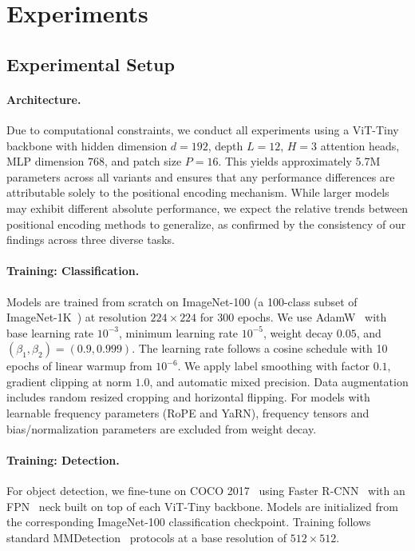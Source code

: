 \section{Experiments}
\label{sec:experiments}

\subsection{Experimental Setup}

\paragraph{Architecture.}
Due to computational constraints, we conduct all experiments using a ViT-Tiny backbone with hidden
dimension $d = 192$, depth $L = 12$, $H = 3$ attention heads, MLP dimension $768$, and patch size
$P = 16$. This yields approximately 5.7M parameters across all variants and ensures that any
performance differences are attributable solely to the positional encoding mechanism. While larger
models may exhibit different absolute performance, we expect the relative trends between positional
encoding methods to generalize, as confirmed by the consistency of our findings across three
diverse tasks.

\paragraph{Training: Classification.}
Models are trained from scratch on ImageNet-100 (a 100-class subset of ImageNet-1K~\cite{deng2009imagenet}) at resolution
$224 \times 224$ for 300 epochs. We use AdamW~\cite{loshchilov2019decoupled} with base learning rate $10^{-3}$, minimum learning
rate $10^{-5}$, weight decay $0.05$, and $(\beta_1, \beta_2) = (0.9, 0.999)$. The learning rate
follows a cosine schedule with 10 epochs of linear warmup from $10^{-6}$. We apply label smoothing
with factor $0.1$, gradient clipping at norm $1.0$, and automatic mixed precision. Data
augmentation includes random resized cropping and horizontal flipping. For models with learnable
frequency parameters (RoPE and YaRN), frequency tensors and bias/normalization parameters are
excluded from weight decay.

\paragraph{Training: Detection.}
For object detection, we fine-tune on COCO 2017~\cite{lin2014microsoft} using Faster R-CNN~\cite{ren2015faster} with an FPN~\cite{lin2017feature} neck built on top of
each ViT-Tiny backbone. Models are initialized from the corresponding ImageNet-100 classification
checkpoint. Training follows standard MMDetection~\cite{chen2019mmdetection} protocols at a base resolution of $512 \times 512$.


